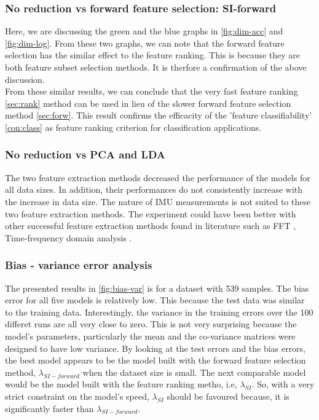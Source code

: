 \subsubsection{No reduction vs forward feature selection: SI-forward}
Here, we are discussing the green and the blue graphs in \ref{fig:dim-acc} and \ref{fig:dim-log}. From these two graphs, we can note that the forward feature selection has the similar effect to the feature ranking. This is because they are both feature subset selection methods. It is therfore a confirmation of the above discussion.\\
From these similar results, we can conclude that the very fast feature ranking \ref{sec:rank} method can be used in lieu of the slower forward feature selection method \ref{sec:forw}. This result confirms the efficacity of the 'feature classifiability' \ref{con:class} as feature ranking criterion for classification applications.

\subsubsection{No reduction vs PCA and LDA}

The two feature extraction methods decreased the performance of the models for all data sizes. In addition, their performances do not consistently increase with the increase in data size. The nature of IMU measurements is not suited to these two feature extraction methods. The experiment could have been better with other successful feature extraction methods found in literature such as FFT \cite{towa2009},
Time-frequency domain analysis \cite{ches2012}.

\subsubsection{Bias - variance error analysis}
The presented results in \ref{fig:bias-var} is for a dataset with 539 samples.
The bias error for all five models is relatively low. This because the test data was similar to the training data. 
Interestingly, the variance in the training errors over the 100 differet runs are all very close to zero. This is not very surprising because the model's parameters, particularly the mean and the co-variance matrices were designed to have low variance. %
By looking at the test errors and the bias errors, the best model appears to be the model built with the forward feature selection method, \(\lambda_{SI-forward}\) when the dataset size is small. The next comparable model would be the model built with the feature ranking metho, i.e, \(\lambda_{SI}\). So, with a very strict constraint on the model's speed, \(\lambda_{SI}\) should be favoured because, it is significantly faster than \(\lambda_{SI-forward}\).

